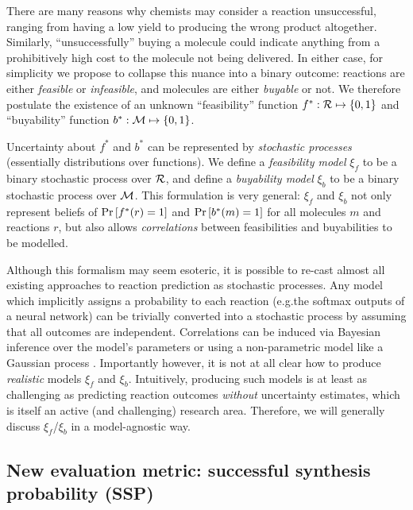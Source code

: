 There are many reasons why chemists may consider a reaction unsuccessful,
ranging from having a low yield to producing the wrong product altogether.
Similarly, ``unsuccessfully'' buying a molecule
could indicate anything from a prohibitively high cost to the molecule not being delivered.
In either case, for simplicity we propose to collapse this nuance into a binary outcome:
reactions are either \emph{feasible} or \emph{infeasible},
and molecules are either \emph{buyable} or not.
We therefore postulate the existence of an unknown
``feasibility'' function $f^*:{\mathcal{R}}\mapsto\{0,1\}$
and ``buyability'' function $b^*:{\mathcal{M}}\mapsto\{0,1\}$.

Uncertainty about $f^*$ and $b^*$ can be represented
by \emph{stochastic processes} (essentially distributions over functions).
We define a \emph{feasibility model} $\xi_f$ to be a binary stochastic process over ${\mathcal{R}}$,
and define a \emph{buyability model} $\xi_b$ to be a binary stochastic process over ${\mathcal{M}}$.
This formulation is very general:
$\xi_f$ and $\xi_b$ not only represent beliefs
of $\Pr\left[f^*(r)=1\right]$
and $\Pr\left[b^*(m)=1\right]$
for all molecules $m$ and reactions $r$,
but also allows \emph{correlations} between feasibilities and buyabilities to be modelled.

Although this formalism may seem esoteric,
it is possible to re-cast almost all existing approaches to reaction prediction
as stochastic processes.
Any model which implicitly assigns a probability
to each reaction (e.g.\@ the softmax outputs of a neural network)
can be trivially converted into a stochastic process by assuming that all outcomes are independent.
Correlations can be induced via Bayesian inference over the model's parameters
\citep{mackay1992practical}
or using a non-parametric model like a Gaussian process
\citep{rasmussen2006gp}.
Importantly however,
it is not at all clear how to produce \emph{realistic}
models $\xi_f$  and $\xi_b$.
Intuitively,  producing such models is at least as challenging
as predicting reaction outcomes \emph{without} uncertainty estimates,
which is itself an active (and challenging) research area.
Therefore, we will generally discuss $\xi_f$/$\xi_b$ in a model-agnostic way. %

\subsection{New evaluation metric: successful synthesis probability (SSP)}

